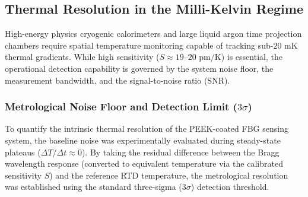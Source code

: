 \documentclass[preprint,11pt]{elsarticle}
\begin{document}
\subsection{Thermal Resolution in the Milli-Kelvin Regime}
\label{subsec:millikelvin_resolution}

High-energy physics cryogenic calorimeters and large liquid argon time projection chambers require spatial temperature monitoring capable of tracking sub-$20\text{ mK}$ thermal gradients. While high sensitivity ($S \approx 19\text{--}20\text{ pm/K}$) is essential, the operational detection capability is governed by the system noise floor, the measurement bandwidth, and the signal-to-noise ratio (SNR).

\subsubsection{Metrological Noise Floor and Detection Limit ($3\sigma$)}

To quantify the intrinsic thermal resolution of the PEEK-coated FBG sensing system, the baseline noise was experimentally evaluated during steady-state plateaus ($\Delta T / \Delta t \approx 0$). By taking the residual difference between the Bragg wavelength response (converted to equivalent temperature via the calibrated sensitivity $S$) and the reference RTD temperature, the metrological resolution was established using the standard three-sigma ($3\sigma$) detection threshold.

\begin{table}[htpb]
    \centering
    \small
    \caption{Metrological noise floor and thermal resolution limits for PEEK-4 fiber at $T \approx 80\text{ K}$.}
    \label{tab:noise_resolution_summary}
\end{table}
\end{document}
